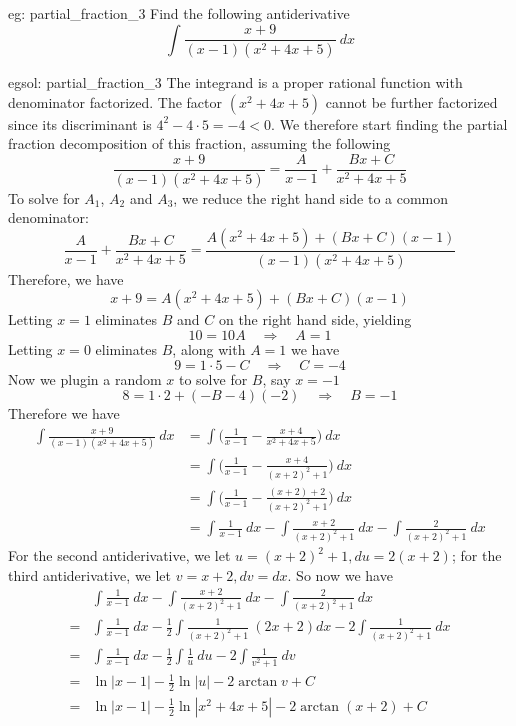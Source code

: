 \begin{eg}[]{eg: partial_fraction_3}
    Find the following antiderivative
    \[\int \frac{x+9}{(x-1)(x^2+4x+5)}~dx\]
\end{eg}
\begin{egsol}[]{egsol: partial_fraction_3}
    The integrand is a proper rational function with denominator factorized.  The factor $(x^2+4x+5)$ cannot be further factorized since its discriminant is $4^2-4 \cdot 5 = -4 < 0$. We therefore start finding the partial fraction decomposition of this fraction, assuming the following
    \[\frac{x+9}{(x-1)(x^2+4x+5)} = \frac{A}{x-1} + \frac{Bx+C}{x^2+4x+5}\]
    To solve for $A_1$, $A_2$ and $A_3$, we reduce the right hand side to a common denominator:
    \[\frac{A}{x-1} + \frac{Bx+C}{x^2+4x+5} = \frac{A(x^2+4x+5)+(Bx+C)(x-1)}{(x-1)(x^2+4x+5)}\]
    Therefore, we have
    \[x+9 = A(x^2+4x+5)+(Bx+C)(x-1)\]
    Letting $x=1$ eliminates $B$ and $C$ on the right hand side, yielding
    \[10 = 10A \quad \Rightarrow \quad A = 1\]
    Letting $x=0$ eliminates $B$, along with $A=1$ we have
    \[9 = 1\cdot5 - C \quad \Rightarrow \quad C = -4\]
    Now we plugin a random $x$ to solve for $B$, say $x = -1$
    \[8 = 1 \cdot 2 + (-B - 4)(-2) \quad \Rightarrow \quad B = -1\]
    Therefore we have
    \begin{align*}
        \int \frac{x+9}{(x-1)(x^2+4x+5)}~dx &= \int \Big(\frac{1}{x-1} - \frac{x+4}{x^2+4x+5}\Big)~dx\\
        &= \int \Big(\frac{1}{x-1} - \frac{x+4}{(x+2)^2+1}\Big)~dx\\
        &= \int \Big(\frac{1}{x-1} - \frac{(x+2)+2}{(x+2)^2+1}\Big)~dx\\
        &= \int \frac{1}{x-1}~dx - \int \frac{x+2}{(x+2)^2+1}~dx - \int \frac{2}{(x+2)^2+1}~dx
    \end{align*}
    For the second antiderivative, we let $u = (x+2)^2+1, du = 2(x+2)$; for the third antiderivative, we let $v = x+2, dv = dx$.  So now we have
    \begin{align*}
        &\int \frac{1}{x-1}~dx - \int \frac{x+2}{(x+2)^2+1}~dx - \int \frac{2}{(x+2)^2+1}~dx\\
        =&\int \frac{1}{x-1}~dx - \frac{1}{2}\int \frac{1}{(x+2)^2+1}~(2x+2)dx - 2\int \frac{1}{(x+2)^2+1}~dx\\
        =&\int \frac{1}{x-1}~dx - \frac{1}{2}\int \frac{1}{u}~du - 2\int \frac{1}{v^2+1}~dv\\
        =&\ln |x-1| - \frac{1}{2} \ln |u| - 2\arctan v + C\\
        =& \ln |x-1| - \frac{1}{2} \ln |x^2+4x+5| - 2\arctan (x+2) + C
    \end{align*}
\end{egsol}
